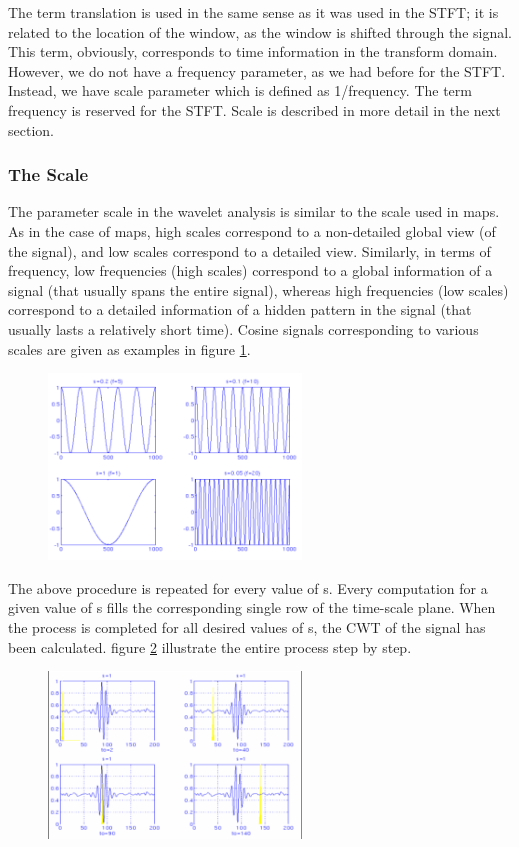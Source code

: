 \documentclass[12pt, a4paper, twoside]{report}
\begin{document}
\par
The term translation is used in the same sense as it was used in the STFT; it is related to the location of the window, as the window is shifted through the signal. This term, obviously, corresponds to time information in the transform domain. However, we do not have a frequency parameter, as we had before for the STFT. Instead, we have scale parameter which is defined as 1/frequency. The term frequency is reserved for the STFT. Scale is described in more detail in the next section.
\subsubsection{The Scale}
The parameter scale in the wavelet analysis is similar to the scale used in maps. As in the case of maps, high scales correspond to a non-detailed global view (of the signal), and low scales correspond to a detailed view. Similarly, in terms of frequency, low frequencies (high scales) correspond to a global information of a signal (that usually spans the entire signal), whereas high frequencies (low scales) correspond to a detailed information of a hidden pattern in the signal (that usually lasts a relatively short time). Cosine signals corresponding to various scales are given as examples in figure \ref{fig:cwt-scale}.
\begin{figure}[!h]
	\centering
	\includegraphics[width=0.6\textwidth]
	{images/chapter3/cwt-scale}
	\caption{}
	\label{fig:cwt-scale}
\end{figure}

The above procedure is repeated for every value of s. Every computation for a given value of s fills the corresponding single row of the time-scale plane. When the process is completed for all desired values of s, the CWT of the signal has been calculated. figure \ref{fig:cwt-1} illustrate the entire process step by step.

\begin{figure}[!h]
	\centering
	\includegraphics[width=0.6\textwidth]
	{images/chapter3/cwt-1}
	\caption{}
	\label{fig:cwt-1}
\end{figure}
\end{document}
